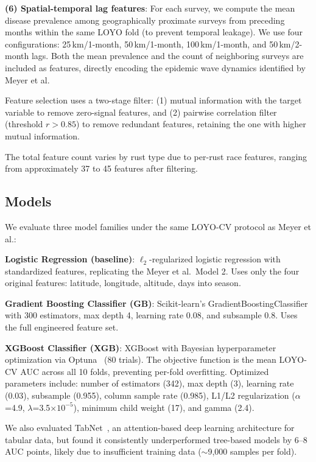\documentclass[10pt,twocolumn,letterpaper]{article}
\begin{document}
\noindent\textbf{(6) Spatial-temporal lag features}: For each survey, we compute the mean disease prevalence among geographically proximate surveys from preceding months within the same LOYO fold (to prevent temporal leakage). We use four configurations: 25\,km/1-month, 50\,km/1-month, 100\,km/1-month, and 50\,km/2-month lags. Both the mean prevalence and the count of neighboring surveys are included as features, directly encoding the epidemic wave dynamics identified by Meyer et al.

Feature selection uses a two-stage filter: (1) mutual information with the target variable to remove zero-signal features, and (2) pairwise correlation filter (threshold $r > 0.85$) to remove redundant features, retaining the one with higher mutual information.

The total feature count varies by rust type due to per-rust race features, ranging from approximately 37 to 45 features after filtering.

\subsection{Models}

We evaluate three model families under the same LOYO-CV protocol as Meyer et al.:

\noindent\textbf{Logistic Regression (baseline)}: $\ell_2$-regularized logistic regression with standardized features, replicating the Meyer et al.\ Model 2. Uses only the four original features: latitude, longitude, altitude, days into season.

\noindent\textbf{Gradient Boosting Classifier (GB)}: Scikit-learn's GradientBoostingClassifier with 300 estimators, max depth 4, learning rate 0.08, and subsample 0.8. Uses the full engineered feature set.

\noindent\textbf{XGBoost Classifier (XGB)}: XGBoost with Bayesian hyperparameter optimization via Optuna~\cite{optuna} (80 trials). The objective function is the mean LOYO-CV AUC across all 10 folds, preventing per-fold overfitting. Optimized parameters include: number of estimators (342), max depth (3), learning rate (0.03), subsample (0.955), column sample rate (0.985), L1/L2 regularization ($\alpha$=4.9, $\lambda$=3.5$\times10^{-5}$), minimum child weight (17), and gamma (2.4).

We also evaluated TabNet~\cite{tabnet}, an attention-based deep learning architecture for tabular data, but found it consistently underperformed tree-based models by 6--8 AUC points, likely due to insufficient training data (${\sim}$9,000 samples per fold).
\end{document}
